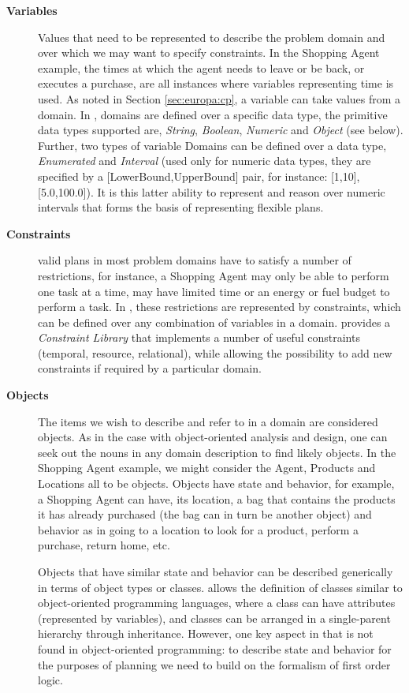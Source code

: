 \begin{description}

\item[\textbf{Variables}] Values that need to be represented to
  describe the problem domain and over which we may want to specify
  constraints. In the Shopping Agent example, the times at which the
  agent needs to leave or be back, or executes a purchase, are all
  instances where variables representing time is used.  As noted in
  Section \ref{sec:europa:cp}, a variable can take values from a
  domain. In \eu, domains are defined over a specific data type, the
  primitive data types supported are, \textit{String},
  \textit{Boolean}, \textit{Numeric} and \textit{Object} (see
  below). Further, two types of variable Domains can be defined over a
  data type, \textit{Enumerated} and \textit{Interval} (used only for
  numeric data types, they are specified by a [LowerBound,UpperBound]
  pair, for instance: [1,10], [5.0,100.0]). It is this latter ability
  to represent and reason over numeric intervals that forms the basis
  of representing flexible plans.

\item[\textbf{Constraints}] valid plans in most problem domains have
  to satisfy a number of restrictions, for instance, a Shopping Agent
  may only be able to perform one task at a time, may have limited
  time or an energy or fuel budget to perform a task. In \eu, these
  restrictions are represented by constraints, which can be defined
  over any combination of variables in a domain. \eu provides a
  \emph{Constraint Library} that implements a number of useful
  constraints (temporal, resource, relational), while allowing the
  possibility to add new constraints if required by a particular
  domain.

\item[\textbf{Objects}] The items we wish to describe and refer to in
  a domain are considered objects. As in the case with object-oriented
  analysis and design, one can seek out the nouns in any domain
  description to find likely objects. In the Shopping Agent example,
  we might consider the Agent, Products and Locations all to be
  objects. Objects have state and behavior, for example, a Shopping
  Agent can have, its location, a bag that contains the products it
  has already purchased (the bag can in turn be another object) and
  behavior as in going to a location to look for a product, perform a
  purchase, return home, etc.

  Objects that have similar state and behavior can be described
  generically in terms of object types or classes. \eu allows the
  definition of classes similar to object-oriented programming
  languages, where a class can have attributes (represented by
  variables), and classes can be arranged in a single-parent hierarchy
  through inheritance.  However, one key aspect in \eu that is not
  found in object-oriented programming: to describe state and behavior
  for the purposes of planning we need to build on the formalism of
  first order logic.


\end{description}
